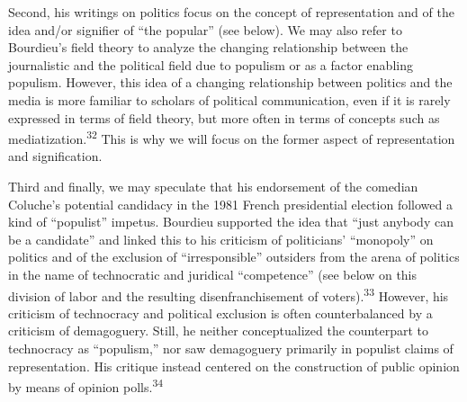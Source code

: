 \documentclass{tufte-handout}
\begin{document}
Second, his writings on politics focus on the concept of representation
and of the idea and/or signifier of ``the popular'' (see below). We may
also refer to Bourdieu's field theory to analyze the changing
relationship between the journalistic and the political field due to
populism or as a factor enabling populism. However, this idea of a
changing relationship between politics and the media is more familiar to
scholars of political communication, even if it is rarely expressed in
terms of field theory, but more often in terms of concepts such as
mediatization.\textsuperscript{32} This is why we will focus on the former
aspect of representation and signification.

Third and finally, we may speculate that his endorsement of the comedian
Coluche's potential candidacy in the 1981 French presidential election
followed a kind of ``populist'' impetus. Bourdieu supported the idea
that ``just anybody can be a candidate'' and linked this to his
criticism of politicians' ``monopoly'' on politics and of the exclusion
of ``irresponsible'' outsiders from the arena of politics in the name of
technocratic and juridical ``competence'' (see below on this division of
labor and the resulting disenfranchisement of voters).\textsuperscript{33} However, his criticism of
technocracy and political exclusion is often counterbalanced by a
criticism of demagoguery. Still, he neither conceptualized the
counterpart to technocracy as ``populism,'' nor saw demagoguery
primarily in populist claims of representation. His critique instead
centered on the construction of public opinion by means of opinion
polls.\textsuperscript{34}
\end{document}
